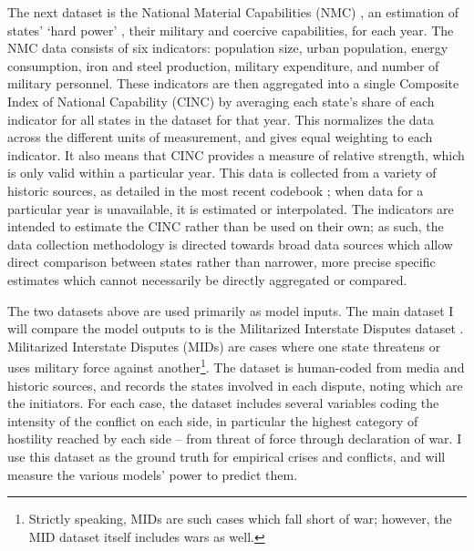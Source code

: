 The next dataset is the National Material Capabilities (NMC) \citep{singer_1972,singer_1988}, an estimation of states' `hard power' \citep{wilson_2008}, their military and coercive capabilities, for each year. The NMC data consists of six indicators: population size, urban population, energy consumption, iron and steel production, military expenditure, and number of military personnel. These indicators are then aggregated into a single Composite Index of National Capability (CINC) by averaging each state's share of each indicator for all states in the dataset for that year. This normalizes the data across the different units of measurement, and gives equal weighting to each indicator. It also means that CINC provides a measure of relative strength, which is only valid within a particular year. This data is collected from a variety of historic sources, as detailed in the most recent codebook \citep{grieg_2010}; when data for a particular year is unavailable, it is estimated or interpolated. The indicators are intended to estimate the CINC rather than be used on their own; as such, the data collection methodology is directed towards broad data sources which allow direct comparison between states rather than narrower, more precise specific estimates which cannot necessarily be directly aggregated or compared.

The two datasets above are used primarily as model inputs. The main dataset I will compare the model outputs to is the Militarized Interstate Disputes dataset \citep{palmer_2015}. Militarized Interstate Disputes (MIDs) are cases where one state threatens or uses military force against another\footnote{Strictly speaking, MIDs are such cases which fall short of war; however, the MID dataset itself includes wars as well.}. The dataset is human-coded from media and historic sources, and records the states involved in each dispute, noting which are the initiators. For each case, the dataset includes several variables coding the intensity of the conflict on each side, in particular the highest category of hostility reached by each side -- from threat of force through declaration of war. I use this dataset as the ground truth for empirical crises and conflicts, and will measure the various models' power to predict them.

